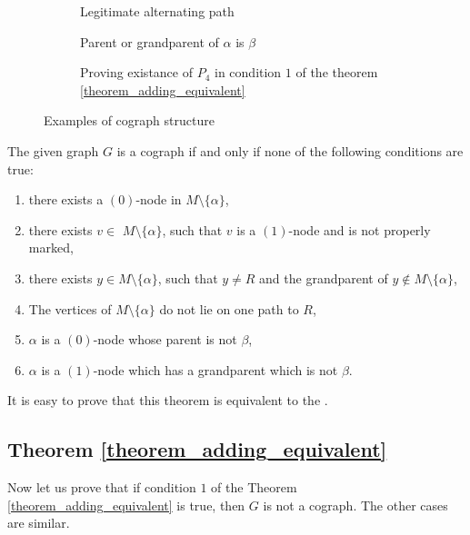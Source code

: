 \begin{figure}
    \centering
\begin{subfigure}[b]{0.3\textwidth}
\centering
    
    \caption{Legitimate alternating path}
    \label{fig:legitimate_alternating_path}
\end{subfigure}
\hfill
\begin{subfigure}[b]{0.3\textwidth}
\centering
    
    \caption{Parent or grandparent of $\alpha$ is $\beta$}
    \label{fig:parent_alpha}
\end{subfigure}
\hfill
\begin{subfigure}[b]{0.3\textwidth}
    \centering
    
    \caption{Proving existance of $P_4$ in condition $1$ of the theorem \ref{theorem_adding_equivalent}}
    \label{fig:theorem_1}
\end{subfigure}
\caption{Examples of cograph structure}
\end{figure}



\begin{theorem}
    \label{theorem_adding_equivalent}
     The given graph $G$ is a cograph if and only if none of the following conditions are true:
    
\begin{enumerate}
    \item there exists a $(0)$-node in $M \setminus \{\alpha\}$,
    \item there exists $v \in$ $ M \setminus \{\alpha\}$, such that $v$ is a $(1)$-node and is not properly marked,
    \item there exists $y \in M \setminus \{\alpha\}$, such that $y \neq R$ and the grandparent of $y \notin M \setminus \{\alpha\}$,
    \item The vertices of $ M \setminus \{\alpha\}$ do not lie on one path to $R$,
    \item $\alpha$ is a $(0)$-node whose parent is not $\beta$,
    \item $\alpha$ is a $(1)$-node which has a grandparent which is not $\beta$.
\end{enumerate}
\end{theorem}
It is easy to prove that this theorem is equivalent to the .

\subsection{Theorem \ref{theorem_adding_equivalent}}
Now let us prove that if condition $1$ of the Theorem \ref{theorem_adding_equivalent} is true, then $G$ is not a cograph. The other cases are similar.

